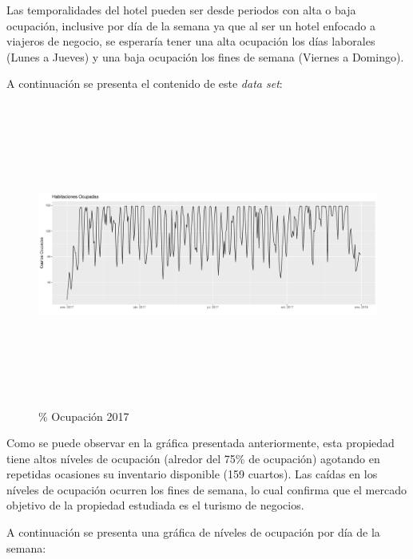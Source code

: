 Las temporalidades del hotel pueden ser desde periodos con alta o baja ocupación, inclusive por día de la semana ya que al ser un hotel enfocado a viajeros de negocio, se esperaría tener una alta ocupación los días laborales (Lunes a Jueves) y una baja ocupación los fines de semana (Viernes a Domingo).

A continuación se presenta el contenido de este \emph{data set}:

\begin{figure}[H]
  \centering
      \includegraphics[width=\maxwidth,height=10cm]{figures/HabitacionesOcupadas-1}   
  \caption{\% Ocupación 2017}
\end{figure}


Como se puede observar en la gráfica presentada anteriormente, esta propiedad tiene altos níveles de ocupación (alredor del 75\% de ocupación) agotando en repetidas ocasiones su inventario disponible (159 cuartos). Las caídas en los níveles de ocupación ocurren los fines de semana, lo cual confirma que el mercado objetivo de la propiedad estudiada es el turismo de negocios.

A continuación se presenta una gráfica de níveles de ocupación por día de la semana:

